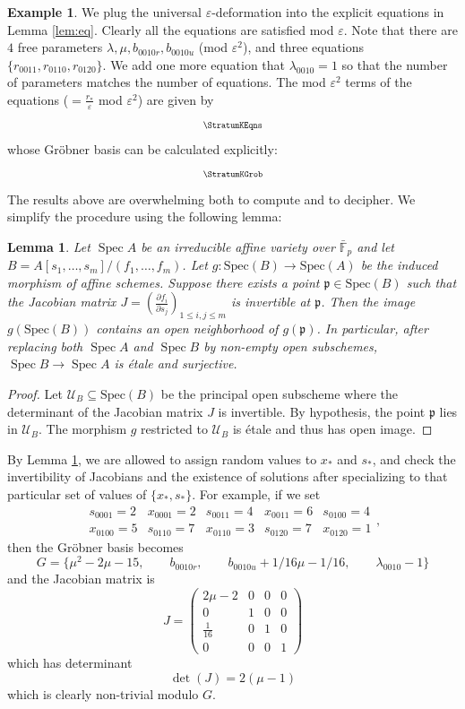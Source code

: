 \documentclass[11pt]{amsart}
\newcommand{\MINOREDITED}[1]{#1}
\newtheorem{lem}[thm]{Lemma}
\theoremstyle{definition}
\newtheorem{example}[thm]{Example}
\newcommand{\cU}{\mathcal{U}}
\newcommand{\bFp}{\bar{\mathbb{F}}_p}
\DeclareMathOperator{\Spec}{Spec}
\begin{document}
\begin{example}
We plug the universal $\varepsilon$-deformation
into the explicit equations in Lemma \ref{lem:eq}.
Clearly all the equations are satisfied mod $\varepsilon$.
Note that there are $4$ free parameters
$\lambda, \mu, b_{0010r}, b_{0010u}$
(mod $\varepsilon^2$),
and three equations
$\{r_{0011}, r_{0110}, r_{0120}\}$.
We add one more equation that $\lambda_{0010}=1$
so that the number of parameters matches the number
of equations.
The mod $\varepsilon^2$ terms of the equations
($=\frac{r_*}{\varepsilon}$ mod $\varepsilon^2$) 
are given by
\[
\scalebox{.7}{
$\StratumKEqns$
}
\]
whose Gr\"obner basis can be calculated explicitly:
\[
\scalebox{.7}{$\StratumKGrob$}
\]
The results above are overwhelming both to compute
and to decipher.
We simplify the procedure using the following lemma:

\begin{lem}
\rm
Let $\Spec A$ be an irreducible
affine variety over $\bFp$
and let $B = A[s_1, \dots, s_m]/(f_1, \dots, f_m)$. Let $g: \mathrm{Spec}(B) \to \mathrm{Spec}(A)$ be the induced morphism of affine schemes. Suppose there exists a point $\mathfrak{p} \in \mathrm{Spec}(B)$ such that the Jacobian matrix $J = \left( \frac{\partial f_i}{\partial s_j} \right)_{1 \le i, j \le m}$ is invertible at $\mathfrak{p}$. Then the image $g(\mathrm{Spec}(B))$ contains an open neighborhood of $g(\mathfrak{p})$. In particular,
after replacing both $\Spec A$ and $\Spec B$ by non-empty open
subschemes, $\Spec B\to \Spec A$
is \MINOREDITED{\'etale and surjective}.
\label{lem:pointwise-check}
\end{lem}

\begin{proof}
Let $\cU_B \subseteq \mathrm{Spec}(B)$ be the principal open subscheme where the determinant of the Jacobian matrix $J$ is invertible. By hypothesis, the point $\mathfrak{p}$ lies in $\cU_B$.
The morphism $g$ restricted to $\cU_B$ is \'etale and thus
has open image.
\end{proof}

By Lemma \ref{lem:pointwise-check},
we are allowed to assign random values
to $x_*$ and $s_*$,
and check the invertibility of Jacobians
and the existence of solutions
after specializing to that particular
set of values of $\{x_*, s_*\}$.
For example, if we set
\[
\begin{matrix}
s_{0001}=2 &
x_{0001}=2 &
s_{0011}=4 &
x_{0011}=6 &
s_{0100}=4 \\
x_{0100}=5 &
s_{0110}=7&
x_{0110}=3&
s_{0120}=7&
x_{0120}=1
\end{matrix},
\]
then the Gr\"obner basis becomes
\[
G=\{\mu^2 - 2\mu - 15,\qquad b_{0010r},\qquad
b_{0010u} + 1/16\mu - 1/16,\qquad
\lambda_{0010} - 1
\}
\]
and the Jacobian matrix is
\[
J = \begin{pmatrix} 2\mu - 2 & 0 & 0 & 0 \\ 0 & 1 & 0 & 0 \\ \frac{1}{16} & 0 & 1 & 0 \\ 0 & 0 & 0 & 1 \end{pmatrix}
\]
which has determinant
\[
\det(J)=2(\mu-1)
\]
which is clearly non-trivial modulo $G$.


\end{example}
\end{document}
